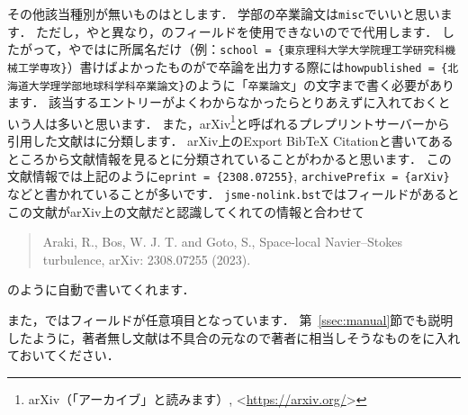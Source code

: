 \documentclass[a4paper,fleqn,uplatex,dvipdfmx]{jsarticle}
\newcommand{\jsmefile}{\texttt{jsme-nolink.bst}}
\begin{document}
その他該当種別が無いものは\ttmisc とします．
学部の卒業論文は\verb|misc|でいいと思います．
ただし，\ttmastersthesis や\ttphdthesis と異なり，\ttschool のフィールドを使用できないので\tthowpublished で代用します．
したがって，\ttmastersthesis や\ttphdthesis では\ttschool に所属名だけ（例：\verb|school = {東京理科大学大学院理工学研究科機械工学専攻}|）書けばよかったものが\ttmisc で卒論を出力する際には\verb|howpublished = {北海道大学理学部地球科学科卒業論文}|のように「\verb|卒業論文|」の文字まで書く必要があります．
該当するエントリーがよくわからなかったらとりあえず\ttmisc に入れておくという人は多いと思います．
また，arXiv\footnote{arXiv（「アーカイブ」と読みます）, \textless\url{https://arxiv.org/}\textgreater}と呼ばれるプレプリントサーバーから引用した文献は\ttmisc に分類します．
arXiv上のExport BibTeX Citationと書いてあるところから文献情報を見ると\ttmisc に分類されていることがわかると思います．
この文献情報では上記のように\verb|eprint = {2308.07255}|, \verb|archivePrefix = {arXiv}|などと書かれていることが多いです．
\jsmefile では\ttarchivePrefix フィールドがあるとこの文献がarXiv上の文献だと認識してくれて\tteprint の情報と合わせて
\begin{quote}
    Araki, R., Bos, W. J. T. and Goto, S., Space-local Navier--Stokes turbulence, arXiv: 2308.07255 (2023).
\end{quote}
のように自動で書いてくれます．

また，\ttmisc では\ttauthor フィールドが任意項目となっています．
第~\ref{ssec:manual}節\ttmanual でも説明したように，著者無し文献は不具合の元なので著者に相当しそうなものを\ttauthor に入れておいてください．
\end{document}
